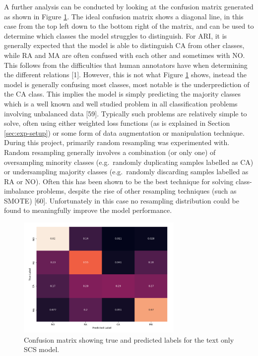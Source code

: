 \documentclass[twocolumn,twoside]{article}
\begin{document}
A further analysis can be conducted by looking at the confusion matrix
generated as shown in Figure \ref{fig:text-only-conf-mat-4class}. The
ideal confusion matrix shows a diagonal line, in this case from the top
left down to the bottom right of the matrix, and can be used to
determine which classes the model struggles to distinguish. For ARI, it
is generally expected that the model is able to distinguish CA from
other classes, while RA and MA are often confused with each other and
sometimes with NO. This follows from the difficulties that human
annotators have when determining the different relations {[}1{]}.
However, this is not what Figure \ref{fig:text-only-conf-mat-4class}
shows, instead the model is generally confusing most classes, most
notable is the underprediction of the CA class. This implies the model
is simply predicting the majority classes which is a well known and well
studied problem in all classification problems involving unbalanced data
{[}59{]}. Typically such problems are relatively simple to solve, often
using either weighted loss functions (as is explained in Section
\ref{sec:exp-setup}) or some form of data augmentation or manipulation
technique. During this project, primarily random resampling was
experimented with. Random resampling generally involves a combination
(or only one) of oversampling minority classes (e.g.~randomly
duplicating samples labelled as CA) or undersampling majority classes
(e.g.~randomly discarding samples labelled as RA or NO). Often this has
been shown to be the best technique for solving class-imbalance
problems, despite the rise of other resampling techniques (such as
SMOTE) {[}60{]}. Unfortunately in this case no resampling distribution
could be found to meaningfully improve the model performance.

\begin{figure}[h]
\centering
\includegraphics[width=8cm]{text-only-conf-mat-4class}
\caption{Confusion matrix showing true and predicted labels for the text only SCS model.\label{fig:text-only-conf-mat-4class}}
\end{figure}
\end{document}

